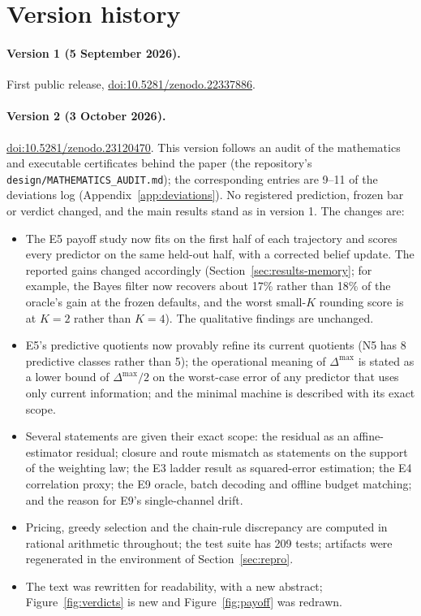 \section{Version history}
\label{app:versions}

\paragraph{Version 1 (5 September 2026).} First public release, \href{https://doi.org/10.5281/zenodo.22337886}{doi:10.5281/zenodo.22337886}.

\paragraph{Version 2 (3 October 2026).} \href{https://doi.org/10.5281/zenodo.23120470}{doi:10.5281/zenodo.23120470}. This version follows an audit of the mathematics and executable certificates behind the paper (the repository's \texttt{design/MATHEMATICS\_AUDIT.md}); the corresponding entries are 9--11 of the deviations log (Appendix~\ref{app:deviations}). No registered prediction, frozen bar or verdict changed, and the main results stand as in version 1. The changes are:
\begin{itemize}[nosep]
\item The E5 payoff study now fits on the first half of each trajectory and scores every predictor on the same held-out half, with a corrected belief update. The reported gains changed accordingly (Section~\ref{sec:results-memory}; for example, the Bayes filter now recovers about 17\% rather than 18\% of the oracle's gain at the frozen defaults, and the worst small-$K$ rounding score is at $K{=}2$ rather than $K{=}4$). The qualitative findings are unchanged.
\item E5's predictive quotients now provably refine its current quotients (N5 has 8 predictive classes rather than 5); the operational meaning of $\Delta^{\max}$ is stated as a lower bound of $\Delta^{\max}/2$ on the worst-case error of any predictor that uses only current information; and the minimal machine is described with its exact scope.
\item Several statements are given their exact scope: the residual as an affine-estimator residual; closure and route mismatch as statements on the support of the weighting law; the E3 ladder result as squared-error estimation; the E4 correlation proxy; the E9 oracle, batch decoding and offline budget matching; and the reason for E9's single-channel drift.
\item Pricing, greedy selection and the chain-rule discrepancy are computed in rational arithmetic throughout; the test suite has 209 tests; artifacts were regenerated in the environment of Section~\ref{sec:repro}.
\item The text was rewritten for readability, with a new abstract; Figure~\ref{fig:verdicts} is new and Figure~\ref{fig:payoff} was redrawn.
\end{itemize}

